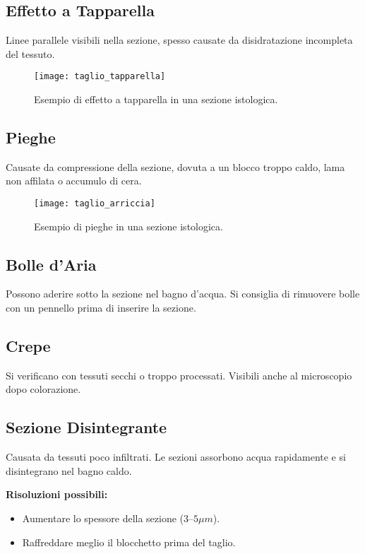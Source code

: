 \subsection{Effetto a Tapparella}

Linee parallele visibili nella sezione, spesso causate da disidratazione incompleta del tessuto.

\begin{figure}[h]
\centering  
\texttt{[image: taglio\_tapparella]}
\caption{Esempio di effetto a tapparella in una sezione istologica.}
\end{figure}

\subsection{Pieghe}

Causate da compressione della sezione, dovuta a un blocco troppo caldo, lama non affilata o accumulo di cera.


\begin{figure}[h]
\centering  
\texttt{[image: taglio\_arriccia]}
\caption{Esempio di pieghe in una sezione istologica.}
\end{figure}

\subsection{Bolle d'Aria}

Possono aderire sotto la sezione nel bagno d'acqua. Si consiglia di rimuovere bolle con un pennello prima di inserire la sezione.

\subsection{Crepe}

Si verificano con tessuti secchi o troppo processati. Visibili anche al microscopio dopo colorazione.

\subsection{Sezione Disintegrante}

Causata da tessuti poco infiltrati. Le sezioni assorbono acqua rapidamente e si disintegrano nel bagno caldo.

\textbf{Risoluzioni possibili:}
\begin{itemize}
    \item Aumentare lo spessore della sezione ($3–5\mu m$).
    \item Raffreddare meglio il blocchetto prima del taglio.
\end{itemize}

